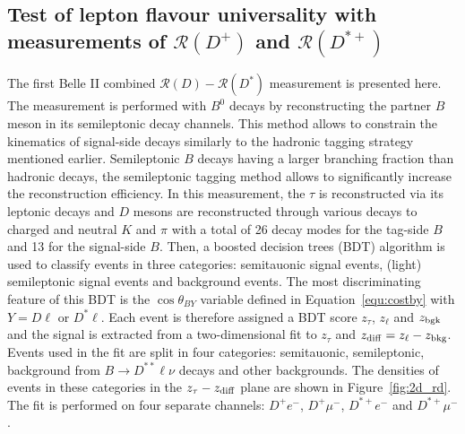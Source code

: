\documentclass{moriond}
\def\costby{\cos\theta_{BY}}
\def\zdiff{z_{\rm diff}}
\def\rd{\mathcal{R}\left(D\right)}
\def\rdp{\mathcal{R}\left(D^+\right)}
\def\rdst{\mathcal{R}\left(D^*\right)}
\def\rdstp{\mathcal{R}\left(D^{*+}\right)}
\begin{document}
\subsection{Test of lepton flavour universality with measurements of $\rdp$ and $\rdstp$}
The first Belle II combined $\rd-\rdst$ measurement is presented here. The measurement is performed with $B^0$ decays by reconstructing the partner $B$ meson in its semileptonic decay channels. This method allows to constrain the kinematics of signal-side decays similarly to the hadronic tagging strategy mentioned earlier. Semileptonic $B$ decays having a larger branching fraction than hadronic decays, the semileptonic tagging method allows to significantly increase the reconstruction efficiency. In this measurement, the $\tau$ is reconstructed via its leptonic decays and $D$ mesons are reconstructed through various decays to charged and neutral $K$ and $\pi$ with a total of 26 decay modes for the tag-side $B$ and 13 for the signal-side $B$. Then, a boosted decision trees (BDT) algorithm is used to classify events in three categories: semitauonic signal events, (light) semileptonic signal events and background events. The most discriminating feature of this BDT is the $\costby$ variable defined in Equation~\ref{equ:costby} with $Y=D\ell$ or $D^*\ell$. Each event is therefore assigned a BDT score $z_\tau$, $z_\ell$ and $z_{\rm bgk}$ and the signal is extracted from a two-dimensional fit to $z_\tau$ and $\zdiff = z_\ell - z_{\rm bkg}$. Events used in the fit are split in four categories: semitauonic, semileptonic, background from $B \to D^{**}\ell\nu$ decays and other backgrounds. The densities of events in these categories in the $z_\tau-\zdiff$ plane are shown in Figure~\ref{fig:2d_rd}. The fit is performed on four separate channels: $D^+e^-$, $D^+\mu^-$, $D^{*+}e^-$ and  $D^{*+}\mu^-$.
\end{document}
